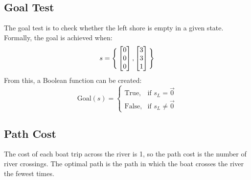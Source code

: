 \documentclass[11pt]{article}
\begin{document}
\subsection{Goal Test}
The goal test is to check whether the left shore is empty in a given state. Formally, the goal is achieved when:
\begin{equation}
s= 
\Bigg{\{}
\begin{bmatrix}
0\\
0\\
0
\end{bmatrix},
\begin{bmatrix}
3\\
3\\
1
\end{bmatrix}
\Bigg{\}}
\end{equation}
From this, a Boolean function can be created:
\begin{equation}
\text{Goal}(s) = \begin{cases} \text{True,} & \text{if } s_L=\vec{0} \\ \text{False,} & \text{if } s_L\neq\vec{0} \end{cases}
\end{equation}

\subsection{Path Cost}
The cost of each boat trip across the river is 1, so the path cost is the number of river crossings. The optimal path is the path in which the boat crosses the river the fewest times. 
\end{document}
